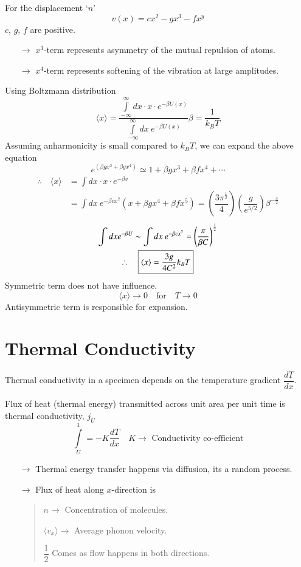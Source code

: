 For the displacement `$n$'
$$
v(x)=cx^{2}-gx^{3}-fx^{y}
$$
$c$, $g$, $f$ are positive.
\begin{itemize}
\item[$\to$] $x^{3}$-term represents asymmetry of the mutual repulsion of atoms.

\item[$\to$] $x^{4}$-term represents softening of the vibration at large amplitudes.
\end{itemize}
Using Boltzmann distribution
$$
\langle x \rangle = \dfrac{\int\limits^{\infty}_{-\infty}dx\cdot x\cdot e^{-\beta U(x)}}{\int\limits^{\infty}_{-\infty}dx \ e^{-\beta U(x)}}\beta=\dfrac{1}{k_{B}T}
$$
Assuming anharmonicity is small compared to $k_{B}T$, we can expand the above equation
$$
e^{(\beta gx^{3}+\beta gx^{4})}\simeq 1+\beta gx^{3}+\beta fx^{4}+\cdots
$$
\begin{align*}
\therefore\quad \langle x\rangle  &= \int dx\cdot x\cdot e^{-\beta v}\\
&= \int dx \ e^{-\beta cx^{2}}(x+\beta gx^{4}+\beta fx^{5})=\left(\dfrac{3\pi^{\frac{1}{2}}}{4}\right)\left(\dfrac{g}{e^{5/2}}\right)\beta^{-\frac{3}{2}}
\end{align*}
\begin{gather*}
\int dx e^{-\beta U}\sim \int dx \ e^{-\beta cx^{2}}=\left(\dfrac{\pi}{\beta C}\right)^{\frac{1}{2}}\\
\therefore\quad \fbox{$\langle x \rangle =\dfrac{3g}{4C^{2}}k_{B}T$}
\end{gather*}
Symmetric term does not have influence.
$$
\langle x\rangle \to 0 \quad\text{for}\quad T\to 0
$$
Antisymmetric term is responsible for expansion.

\section*{Thermal Conductivity}

Thermal conductivity in a specimen depends on the temperature gradient $\dfrac{dT}{dx}$.

Flux of heat (thermal energy) transmitted across unit area per unit time is thermal conductivity, $j_{U}$
$$
\int\limits^{1}_{U}=-K\dfrac{dT}{dx}\quad K\to \text{ Conductivity co-efficient}
$$
\begin{itemize}
\item[$\to$] Thermal energy transfer happens via diffusion, its a random process.

\item[$\to$] Flux of heat along $x$-direction is 
\begin{quote}
$n\to$ Concentration of molecules.

$\langle v_{x}\rangle\to$ Average phonon velocity.

$\dfrac{1}{2}$ Comes as flow happens in both directions.
\end{quote}
\end{itemize}

